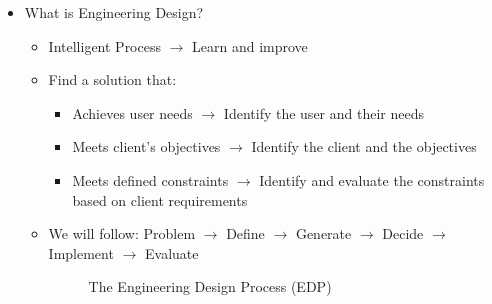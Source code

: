\begin{itemize}
\begin{itemize}
    \end{itemize}

  \item What is Engineering Design?

    \begin{itemize}

      \item Intelligent Process $\rightarrow$ Learn and improve

      \item Find a solution that:

        \begin{itemize}

          \item Achieves user needs $\rightarrow$ Identify the user and their needs

          \item Meets client's objectives $\rightarrow$ Identify the client and the objectives

          \item Meets defined constraints $\rightarrow$ Identify and evaluate the constraints based on client requirements

        \end{itemize}

        \newpage

      \item We will follow: Problem $\rightarrow$ Define $\rightarrow$ Generate $\rightarrow$ Decide $\rightarrow$ Implement $\rightarrow$ Evaluate

        \begin{figure}[h!]
          \centering 
          \caption{The Engineering Design Process (EDP)}
        \end{figure}

    \end{itemize}

\end{itemize}



